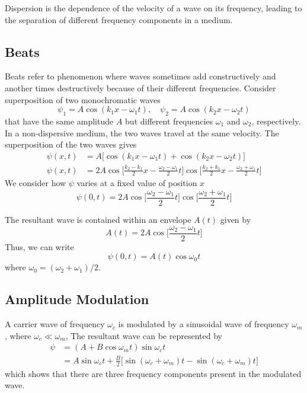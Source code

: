 \documentclass[../../../main.tex]{subfiles}
\begin{document}
Dispersion is the dependence of the velocity of a wave on its frequency, leading to the separation of different frequency components in a medium.
\subsection{Beats}
Beats refer to phenomenon where waves sometimes add constructively and another times destructively because of their different frequencies. Consider superposition of two monochromatic waves
\begin{equation*}
    \psi_1=A \cos(k_1x - \omega_1t),\quad \psi_2=A \cos(k_2x - \omega_2t)
\end{equation*}
that have the same amplitude $A$ but different frequencies $\omega_1$ and $\omega_2$, respectively. In a non-dispersive medium, the two waves travel at the same velocity. The superposition of the two waves gives
\begin{align*}
    \psi(x,t)&=A\big[\cos(k_1x - \omega_1t)+ \cos(k_2x - \omega_2t)\big]\\
    \psi(x,t)&=2A\cos\bigg[\frac{k_2-k_1}{2}x-\frac{\omega_2-\omega_1}{2}t]\cos\bigg[\frac{k_2+k_1}{2}x-\frac{\omega_2+\omega_1}{2}t\bigg]
\end{align*}
We consider how $\psi$ varies at a ﬁxed value of position $x$
\begin{equation*}
    \psi(0,t)=2A\cos\bigg[\frac{\omega_2-\omega_1}{2}t\bigg] \cos\bigg[\frac{\omega_2+\omega_1}{2}t\bigg]
\end{equation*}

The resultant wave is contained within an envelope $A(t)$ given by
\begin{equation*}
    A(t)=2A\cos\bigg[\frac{\omega_2-\omega_1}{2}t\bigg]
\end{equation*}
Thus, we can write 
\begin{equation*}
    \psi(0,t)=A(t)\cos \omega_0 t
\end{equation*}
where $\omega_0=(\omega_2+\omega_1)/2$.

\subsection{Amplitude Modulation}
A carrier wave of frequency $\omega_c$ is modulated by a sinusoidal wave of frequency $\omega_m$, where $\omega_c \ll \omega_m$, The resultant wave can be represented by
\begin{align*}
    \psi &= (A + B \cos \omega_mt) \sin \omega_ct\\
    &=A\sin \omega_ct+\frac{B}{2}\big[\sin (\omega_c+\omega_m)t-\sin (\omega_c+\omega_m)t\big]
\end{align*}
which shows that there are three frequency components present in the modulated wave. 
\end{document}
